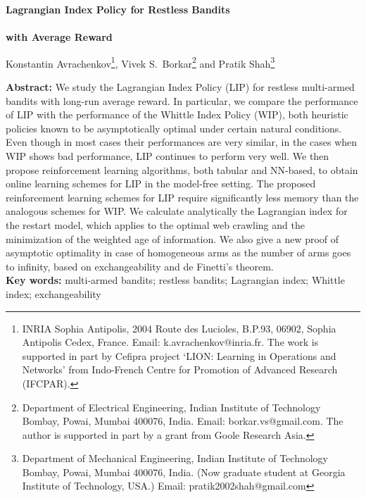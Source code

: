 \documentclass[12pt]{article}
\numberwithin{equation}{section}
\newcommand{\1}{\textbf{1}}
\begin{document}
\begin{center}
\textbf{\Large Lagrangian Index Policy for Restless  Bandits \\ \ \\ with Average Reward }
\end{center}

\bigskip

\begin{center}
Konstantin Avrachenkov\footnote{INRIA Sophia Antipolis,
2004 Route des Lucioles, B.P.93,
06902, Sophia Antipolis Cedex, France. Email: k.avrachenkov@inria.fr. The work is supported in part by Cefipra project `LION: Learning in Operations and Networks' from Indo-French Centre for Promotion of Advanced Research (IFCPAR).}, Vivek S.\ Borkar\footnote{Department of Electrical Engineering, Indian Institute of Technology Bombay, Powai, Mumbai 400076, India. Email: borkar.vs@gmail.com. The author is supported in part by a grant from Goole Research Asia.} and Pratik Shah\footnote{Department of Mechanical Engineering, Indian Institute of Technology Bombay, Powai, Mumbai 400076, India. (Now graduate student at Georgia Institute of Technology, USA.) Email: pratik2002shah@gmail.com}
\end{center}

\bigskip

\noindent \textbf{\large Abstract:} We study the Lagrangian Index Policy (LIP) for restless multi-armed bandits with long-run average
reward. In particular, we compare the performance of LIP with the performance of the Whittle Index Policy (WIP),
both heuristic policies known to be asymptotically optimal under certain natural conditions. Even though in most cases
their performances are very similar, in the cases when WIP shows bad performance, LIP continues to perform very well. 
We then propose reinforcement learning algorithms, both tabular and NN-based, to obtain online learning schemes for 
LIP in the model-free setting.
The proposed reinforcement learning schemes for LIP require significantly less memory than the analogous schemes for WIP.
We calculate analytically the Lagrangian index for the restart model, which applies to the optimal web crawling and the minimization
of the weighted age of information. 
We also give a new proof of asymptotic optimality in case of homogeneous arms as the number of arms goes to infinity, 
based on exchangeability and de Finetti's theorem.\\

\noindent \textbf{Key words:} multi-armed bandits; restless bandits; Lagrangian index; Whittle index; exchangeability\\
\end{document}
